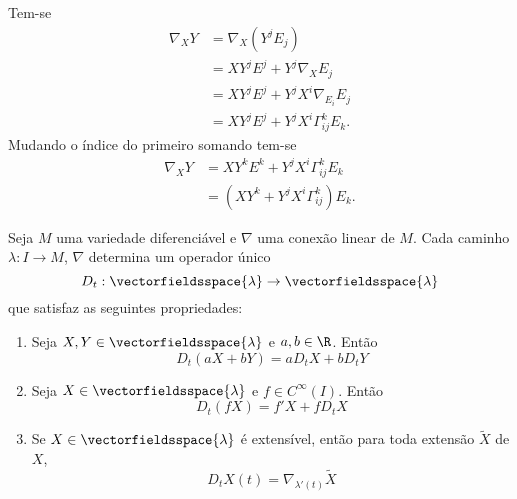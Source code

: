 \begin{demonstracao}
	Tem-se
	\begin{align*}
		\nabla_X Y &= \nabla_X (Y^j E_j)\\
		&= X Y^j E^j + Y^j \nabla_X E_j\\
		&= X Y^j E^j + Y^j X^i \nabla_{E_i} E_j\\
		&= X Y^j E^j + Y^j X^i \Gamma^k_{ij} E_k.
	\end{align*}
	Mudando o índice do primeiro somando tem-se
	\begin{align*}
		\nabla_X Y &= X Y^k E^k + Y^j X^i \Gamma^k_{ij} E_k\\
		&= (X Y^k + Y^j X^i \Gamma^k_{ij}) E_k.
	\end{align*}
\end{demonstracao}

\begin{proposicao}\label{derivada-covariante-de-um-caminho}
	Seja $M$ uma variedade diferenciável e
	$\nabla$ uma conexão linear de $M$.
	Cada caminho $\lambda: I \rightarrow M$, $\nabla$ determina um operador único
	\begin{equation*}
	D_t: \vectorfieldsspace{\lambda} \rightarrow \vectorfieldsspace{\lambda}
	\end{equation*}
	que satisfaz as seguintes propriedades:
	\begin{enumerate}
		\item Seja $X,Y \in \vectorfieldsspace{\lambda}$ e $a,b \in \R$. Então
		\begin{equation*}
		D_t(aX + bY) = a D_t X + b D_t Y
		\end{equation*}
		\item Seja $X \in \vectorfieldsspace{\lambda}$ e $f \in C^{\infty}(I)$. Então
		\begin{equation*}
		D_t(fX) = f' X + f D_t X
		\end{equation*}
		\item Se $X \in \vectorfieldsspace{\lambda}$ é extensível, então para toda extensão $\tilde{X}$ de $X$,
		\begin{equation*}
		D_t X(t) = \nabla_{\lambda'(t)} \tilde{X}
		\end{equation*}
	\end{enumerate}
\end{proposicao}

